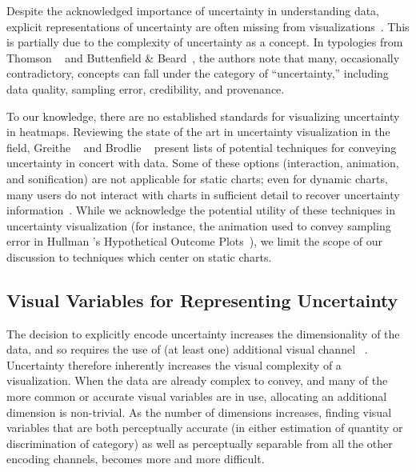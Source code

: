 
Despite the acknowledged importance of uncertainty in understanding data, explicit representations of uncertainty are often missing from visualizations~\cite{boukhelifa2009uncertainty}. This is partially due to the complexity of uncertainty as a concept. In typologies from Thomson \ea~\cite{thomson2005typology} and Buttenfield \& Beard~\cite{buttenfield1994graphical}, the authors note that many, occasionally contradictory, concepts can fall under the category of ``uncertainty,'' including data quality, sampling error, credibility, and provenance.

To our knowledge, there are no established standards for visualizing uncertainty in heatmaps. Reviewing the state of the art in uncertainty visualization in the field, Greithe \ea~\cite{griethe2006visualization} and Brodlie \ea~\cite{brodlie2012review} present lists of potential techniques for conveying uncertainty in concert with data. Some of these options (interaction, animation, and sonification) are not applicable for static charts; even for dynamic charts, many users do not interact with charts in sufficient detail to recover uncertainty information~\cite{nyt2016}. While we acknowledge the potential utility of these techniques in uncertainty visualization (for instance, the animation used to convey sampling error in Hullman \ea's Hypothetical Outcome Plots~\cite{hullman2015hypothetical}), we limit the scope of our discussion to techniques which center on static charts.

\subsection{Visual Variables for Representing Uncertainty}

The decision to explicitly encode uncertainty increases the dimensionality of the data, and so requires the use of (at least one) additional visual channel ~\cite{brodlie2012review}. Uncertainty therefore inherently increases the visual complexity of a visualization. When the data are already complex to convey, and many of the more common or accurate visual variables are in use, allocating an additional dimension is non-trivial. As the number of dimensions increases, finding visual variables that are both perceptually accurate (in either estimation of quantity or discrimination of category) as well as perceptually separable from all the other encoding channels, becomes more and more difficult. 


